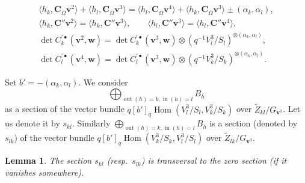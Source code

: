 \documentclass[12pt]{amsart}
\newcommand{\rom}{\textup}
\newtheorem{Lemma}[equation]{Lemma}
\theoremstyle{definition}
\theoremstyle{remark}
\numberwithin{equation}{subsection}
\newcommand{\Hom}{\operatorname{Hom}}
\newcommand{\vin}{\operatorname{in}} %
\newcommand{\vout}{\operatorname{out}} %
\newcommand{\bv}{{\mathbf v}} %
\newcommand{\bw}{{\mathbf w}} %
\newcommand{\bC}{{\mathbf C}} %
\begin{document}
{\allowdisplaybreaks[4]
\begin{equation}
\label{eq:notice}
\begin{gathered}
   \langle h_k, \bC_{\overline{\Omega}}\bv^2\rangle
  +\langle h_l, \bC_{\overline{\Omega}}\bv^3\rangle
   = \langle h_l, \bC_{\overline{\Omega}}\bv^4\rangle
    +\langle h_k, \bC_{\overline{\Omega}}\bv^3\rangle
   \pm (\alpha_k,\alpha_l),\\
   \langle h_k, \bC''\bv^2\rangle = \langle h_k, \bC''\bv^3\rangle, \qquad 
   \langle h_l, \bC''\bv^3\rangle = \langle h_l, \bC''\bv^4\rangle, \\
   \det C_k^{\prime\bullet}(\bv^2,\bw)
   = \det C_k^{\prime\bullet}(\bv^3,\bw)\otimes
   (q^{-1}V^3_l/S_l)^{\otimes (\alpha_k,\alpha_l)},\\
   \det C_l^{\prime\bullet}(\bv^4,\bw)
   = \det C_l^{\prime\bullet}(\bv^3,\bw)\otimes
   (q^{-1}V^3_k/S_k)^{\otimes (\alpha_k,\alpha_l)}.
\end{gathered}
\end{equation}
}

Set $b' = -(\alpha_k,\alpha_l)$.
We consider
\begin{equation*}
  \bigoplus_{\vout(h)=k, \vin(h)=l} B_{\overline h}
\end{equation*}
as a section of the vector bundle
$
q [b']_q \Hom(V^3_l/S_l, V^3_k/S_k)
$
over
$
  \widetilde Z_{kl}/G_{\bv^3}
$.
Let us denote it by $s_{kl}$.
Similarly
$
\bigoplus_{\vout(h)=k, \vin(h)=l} B_{h}
$
is a section (denoted by $s_{lk}$) of the vector bundle
$
q [b']_q \Hom(V^3_k/S_k, V^3_l/S_l)
$
over
$
  \widetilde Z_{lk}/G_{\bv^3}
$.
\begin{Lemma}\label{lem:transzero}
The section $s_{kl}$ \rom(resp.\ $s_{lk}$\rom) is transversal to the
zero section
\rom(if it vanishes somewhere\rom).
\end{Lemma}
\end{document}
